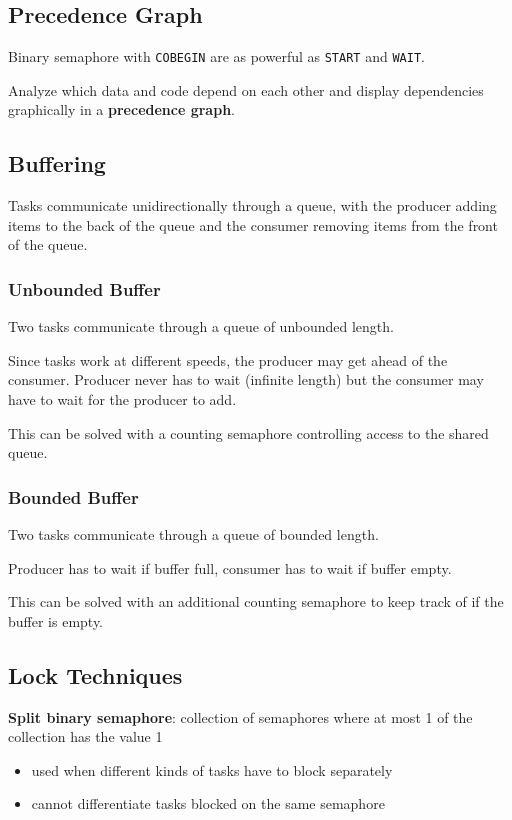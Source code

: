 \documentclass[11pt]{article}
\begin{document}
\subsection{Precedence Graph}
\label{sec:orgfbbdd43}
Binary semaphore with \texttt{COBEGIN} are as powerful as \texttt{START} and \texttt{WAIT}.

Analyze which data and code depend on each other and display dependencies graphically
in a \textbf{precedence graph}.
\subsection{Buffering}
\label{sec:org56ca408}
Tasks communicate unidirectionally through a queue, with the producer adding items to the back
of the queue and the consumer removing items from the front of the queue.
\subsubsection{Unbounded Buffer}
\label{sec:org4fe8982}
Two tasks communicate through a queue of unbounded length.

Since tasks work at different speeds, the producer may get ahead of the consumer.
Producer never has to wait (infinite length) but the consumer may have to wait for the producer to add.

This can be solved with a counting semaphore controlling access to the shared queue.
\subsubsection{Bounded Buffer}
\label{sec:orgc896b2b}
Two tasks communicate through a queue of bounded length.

Producer has to wait if buffer full, consumer has to wait if buffer empty.

This can be solved with an additional counting semaphore to keep track of if the buffer is empty.
\subsection{Lock Techniques}
\label{sec:org69f8e57}
\textbf{Split binary semaphore}: collection of semaphores where at most 1 of the collection has the value 1
\begin{itemize}
\item used when different kinds of tasks have to block separately
\item cannot differentiate tasks blocked on the same semaphore
\end{itemize}
\end{document}
